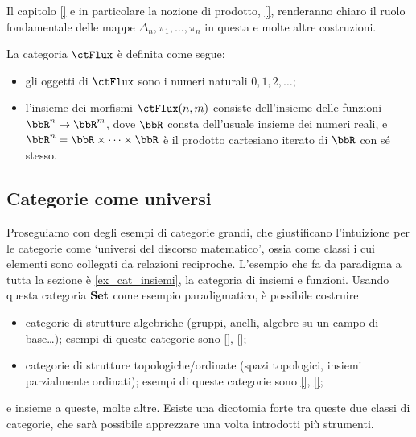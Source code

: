 Il capitolo \ref{} e in particolare la nozione di prodotto, \ref{}, renderanno chiaro il ruolo fondamentale delle mappe $\Delta_n,\pi_1,\dots,\pi_n$ in questa e molte altre costruzioni.
\begin{example}\label{ex_cat_flusso}
	La categoria \(\ctFlux\) è definita come segue:
	\begin{itemize}
		\item gli oggetti di \(\ctFlux\) sono i numeri naturali \(0,1,2,\dots\);
		\item l'insieme dei morfismi \(\ctFlux(n,m)\) consiste dell'insieme delle funzioni \(\bbR^n\to \bbR^m\), dove \(\bbR\) consta dell'usuale insieme dei numeri reali, e \(\bbR^n = \bbR\times\dots\times\bbR\) è il prodotto cartesiano iterato di \(\bbR\) con sé stesso.
	\end{itemize}
\end{example}
\subsection{Categorie come universi}\label{ssec:categorie_universi}
Proseguiamo con degli esempi di categorie grandi, che giustificano l'intuizione per le categorie come `universi del discorso matematico', ossia come classi i cui elementi sono collegati da relazioni reciproche. L'esempio che fa da paradigma a tutta la sezione è \ref{ex_cat_insiemi}, la categoria di insiemi e funzioni. Usando questa categoria $\mathbf{Set}$ come esempio paradigmatico, è possibile costruire
\begin{itemize}
  \item categorie di strutture algebriche (gruppi, anelli, algebre su un campo di base\dots); esempi di queste categorie sono \ref{}, \ref{};
  \item categorie di strutture topologiche/ordinate (spazi topologici, insiemi parzialmente ordinati); esempi di queste categorie sono \ref{}, \ref{};
\end{itemize}
e insieme a queste, molte altre. Esiste una dicotomia forte tra queste due classi di categorie, che sarà possibile apprezzare una volta introdotti più strumenti.

